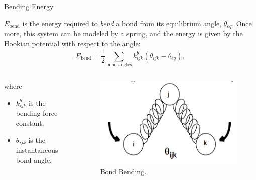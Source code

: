 \documentclass[aspectratio=169]{beamer}
\begin{document}
\begin{frame}[fragile]{Bending Energy}
	
$E_{\text{bend}}$ is the energy required to \emph{bend} a bond from its equilibrium angle, $\theta_{eq}$. Once more, this system can be modeled by a spring, and the energy is given by the Hookian potential with respect to the angle:
%
\begin{equation}
	E_{\text{bend}} = \frac{1}{2} \sum_{\text{bend angles}} k_{ijk}^{b} \left(\theta_{ijk} - \theta_{eq} \right),
\end{equation}
%
%
\begin{columns}
\begin{column}{0.5\textwidth}
	where
	\begin{itemize}
		\item $k_{ijk}^{b}$ is the bending force constant.
		\item $\theta_{ijk}$ is the instantaneous bond angle.
	\end{itemize}
\end{column}
%
\begin{column}{0.5\textwidth} 
	\begin{figure}
		\includegraphics[scale=0.5]{Graphics/bend.png}
		\caption{Bond Bending.}
	\end{figure}
\end{column}
\end{columns}
%

\end{frame}
\end{document}
